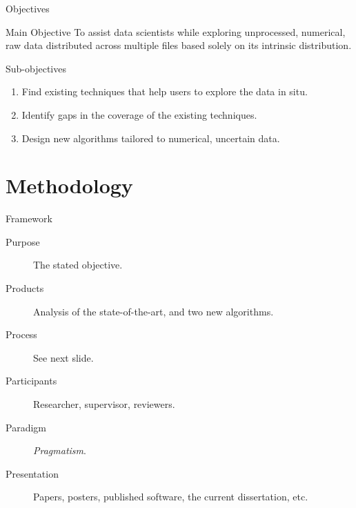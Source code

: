 \documentclass[10pt,compress]{beamer}
\begin{document}
\begin{frame}{Objectives}
\begin{alertblock}{Main Objective}
    \smallskip
    To assist data scientists while exploring unprocessed, numerical, raw data distributed across multiple
    files based solely on its intrinsic distribution.
\end{alertblock}

\begin{block}{Sub-objectives}
    \begin{enumerate}
        \item Find existing techniques that help users to explore the data in situ.
        \item Identify gaps in the coverage of the existing techniques.
        \item Design new algorithms tailored to numerical, uncertain data.
    \end{enumerate}
\end{block}

\end{frame}

\section{Methodology}

\begin{frame}{Framework}
\begin{block}{\alert{\cite{Oates2006}}}

\begin{description}
    \item[Purpose] The stated objective.
    \item[Products] Analysis of the state-of-the-art, and two new algorithms.
    \item[Process] See next slide.
    \item[Participants] Researcher, supervisor, reviewers.
    \item[Paradigm] \emph{Pragmatism}.
    \item[Presentation] Papers, posters, published software, the current dissertation, etc.
\end{description}

\end{block}

\end{frame}
\end{document}
